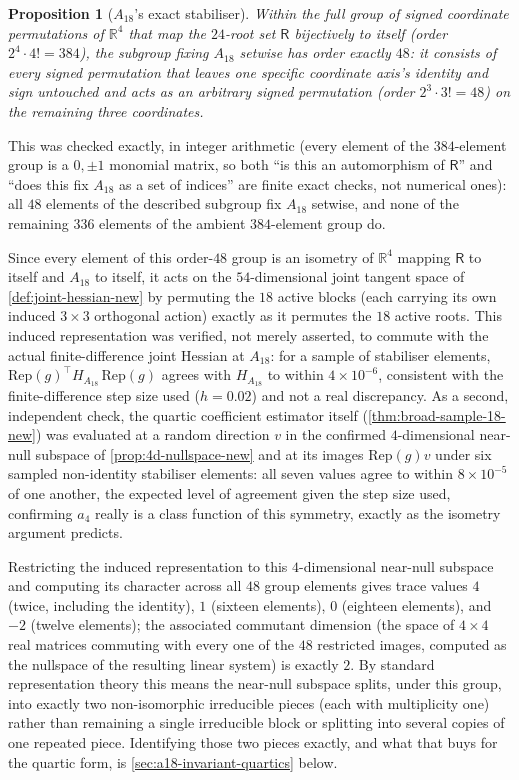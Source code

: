 \documentclass[11pt,reqno]{amsart}
\renewcommand{\_}{\origunderscore\allowbreak}
\numberwithin{equation}{section}
\theoremstyle{plain}
\newtheorem{prop}[thm]{Proposition}
\theoremstyle{definition}
\theoremstyle{remark}
\newcommand{\Rt}{\mathsf{R}}                 %
\begin{document}
\begin{prop}[$A_{18}$'s exact stabiliser]\label{prop:a18-stabiliser}
Within the full group of signed coordinate permutations of $\mathbb{R}^4$
that map the $24$-root set $\Rt$ bijectively to itself (order $2^4\cdot
4!=384$), the subgroup fixing $A_{18}$ setwise has order exactly $48$: it
consists of every signed permutation that leaves one specific coordinate
axis's identity and sign untouched and acts as an arbitrary signed
permutation (order $2^3\cdot3!=48$) on the remaining three coordinates.
\end{prop}

This was checked exactly, in integer arithmetic (every element of the
$384$-element group is a $0,\pm1$ monomial matrix, so both ``is this an
automorphism of $\Rt$'' and ``does this fix $A_{18}$ as a set of
indices'' are finite exact checks, not numerical ones): all $48$
elements of the described subgroup fix $A_{18}$ setwise, and none of the
remaining $336$ elements of the ambient $384$-element group do.

Since every element of this order-$48$ group is an isometry of
$\mathbb{R}^4$ mapping $\Rt$ to itself and $A_{18}$ to itself, it acts on
the $54$-dimensional joint tangent space of \cref{def:joint-hessian-new}
by permuting the $18$ active blocks (each carrying its own induced
$3\times3$ orthogonal action) exactly as it permutes the $18$ active
roots. This induced representation was verified, not merely asserted,
to commute with the actual finite-difference joint Hessian at $A_{18}$:
for a sample of stabiliser elements, $\mathrm{Rep}(g)^\top H_{A_{18}}\,
\mathrm{Rep}(g)$ agrees with $H_{A_{18}}$ to within
$4\times10^{-6}$, consistent with the finite-difference step size used ($h=0.02$) and not a real discrepancy. As a second, independent
check, the quartic coefficient estimator itself
(\cref{thm:broad-sample-18-new}) was evaluated at a random direction $v$
in the confirmed $4$-dimensional near-null subspace of
\cref{prop:4d-nullspace-new} and at its images $\mathrm{Rep}(g)v$ under
six sampled non-identity stabiliser elements: all seven values agree to
within $8\times10^{-5}$ of one another, the expected level of agreement
given the step size used, confirming $a_4$ really is a class function of
this symmetry, exactly as the isometry argument predicts.

Restricting the induced representation to this $4$-dimensional near-null
subspace and computing its character across all $48$ group elements
gives trace values $4$ (twice, including the identity), $1$ (sixteen
elements), $0$ (eighteen elements), and $-2$ (twelve elements); the
associated commutant dimension (the space of $4\times4$ real matrices
commuting with every one of the $48$ restricted images, computed as the
nullspace of the resulting linear system) is exactly $2$. By standard
representation theory this means the near-null subspace splits, under
this group, into exactly two non-isomorphic irreducible pieces (each
with multiplicity one) rather than remaining a single irreducible block
or splitting into several copies of one repeated piece. Identifying
those two pieces exactly, and what that buys for the quartic form, is
\cref{sec:a18-invariant-quartics} below.
\end{document}
